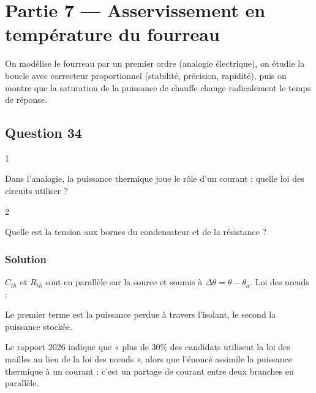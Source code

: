 \documentclass[11pt,a4paper]{article}
\newcommand{\equationajustee}[1]{%
  \sbox{\boiteequation}{$\displaystyle #1$}%
  \ifdim\wd\boiteequation>\linewidth
    \[\resizebox{\linewidth}{!}{\usebox{\boiteequation}}\]%
  \else
    \[#1\]%
  \fi}
\begin{document}
\hypertarget{partie-7-asservissement-en-tempuxe9rature-du-fourreau}{%
\section{Partie 7 --- Asservissement en température du fourreau}\label{partie-7-asservissement-en-tempuxe9rature-du-fourreau}}

On modélise le fourreau par un premier ordre (analogie électrique), on étudie la boucle avec correcteur proportionnel (stabilité, précision, rapidité), puis on montre que la saturation de la puissance de chauffe change radicalement le temps de réponse.

\hypertarget{question-34}{%
\subsection{Question 34}\label{question-34}}

\begin{indication}{1}

Dans l'analogie, la puissance thermique joue le rôle d'un courant : quelle loi des circuits utiliser ?

\end{indication}

\begin{indication}{2}

Quelle est la tension aux bornes du condensateur et de la résistance ?

\end{indication}

\hypertarget{solution-33}{%
\subsubsection{Solution}\label{solution-33}}

\(C_{th}\) et \(R_{th}\) sont en parallèle sur la source et soumis à \(\Delta\theta=\theta-\theta_a\). Loi des nœuds :

\equationajustee{\boxed{P_{th}(t)=\frac{\Delta\theta(t)}{R_{th}}+C_{th}\,\frac{\mathrm d\Delta\theta(t)}{\mathrm dt}}}

Le premier terme est la puissance perdue à travers l'isolant, le second la puissance stockée.

\begin{piege}

Le rapport 2026 indique que « plus de 30\% des candidats utilisent la loi des mailles au lieu de la loi des nœuds », alors que l'énoncé assimile la puissance thermique à un courant : c'est un partage de courant entre deux branches en parallèle.

\end{piege}
\end{document}
